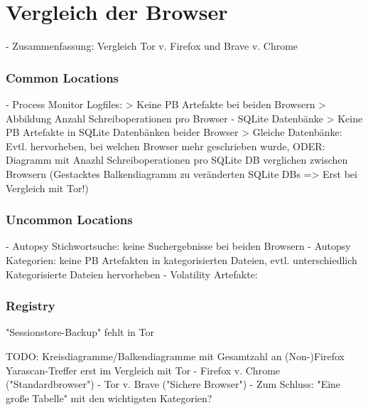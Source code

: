 \chapter{Vergleich der Browser}

- Zusammenfassung: Vergleich Tor v. Firefox und Brave v. Chrome

\subsection*{Common Locations}
- Process Monitor Logfiles: 
	> Keine PB Artefakte bei beiden Browsern
	> Abbildung Anzahl Schreiboperationen pro Browser
- SQLite Datenbänke
	> Keine PB Artefakte in SQLite Datenbänken beider Browser
	> Gleiche Datenbänke: Evtl. hervorheben, bei welchen Browser mehr geschrieben wurde, ODER: Diagramm mit Anazhl Schreiboperationen pro SQLite DB verglichen zwischen Browsern
		(Gestacktes Balkendiagramm zu veränderten SQLite DBs => Erst bei Vergleich mit Tor!)

\subsection*{Uncommon Locations}
- Autopsy Stichwortsuche: keine Suchergebnisse bei beiden Browsern
- Autopsy Kategorien: keine PB Artefakten in kategorisierten Dateien, evtl. unterschiedlich Kategorisierte Dateien hervorheben
- Volatility Artefakte:

\subsection*{Registry}


	
 "Sessionstore-Backup" fehlt in Tor

TODO: Kreisdiagramme/Balkendiagramme mit Gesamtzahl an (Non-)Firefox Yarascan-Treffer erst im Vergleich mit Tor
- Firefox v. Chrome ("Standardbrowser")
- Tor v. Brave ("Sichere Browser")
- Zum Schluss: "Eine große Tabelle" mit den wichtigsten Kategorien?
